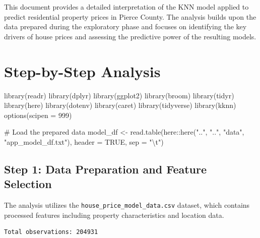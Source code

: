 \documentclass[
  english,
  letterpaper,
  DIV=11,
  numbers=noendperiod]{scrreprt}
\newenvironment{Shaded}{\begin{snugshade}}{\end{snugshade}}
\newcommand{\AttributeTok}[1]{\textcolor[rgb]{0.40,0.45,0.13}{#1}}
\newcommand{\CommentTok}[1]{\textcolor[rgb]{0.37,0.37,0.37}{#1}}
\newcommand{\ConstantTok}[1]{\textcolor[rgb]{0.56,0.35,0.01}{#1}}
\newcommand{\DecValTok}[1]{\textcolor[rgb]{0.68,0.00,0.00}{#1}}
\newcommand{\FunctionTok}[1]{\textcolor[rgb]{0.28,0.35,0.67}{#1}}
\newcommand{\NormalTok}[1]{\textcolor[rgb]{0.00,0.23,0.31}{#1}}
\newcommand{\OtherTok}[1]{\textcolor[rgb]{0.00,0.23,0.31}{#1}}
\newcommand{\SpecialCharTok}[1]{\textcolor[rgb]{0.37,0.37,0.37}{#1}}
\newcommand{\StringTok}[1]{\textcolor[rgb]{0.13,0.47,0.30}{#1}}
\begin{document}
This document provides a detailed interpretation of the KNN model
applied to predict residential property prices in Pierce County. The
analysis builds upon the data prepared during the exploratory phase and
focuses on identifying the key drivers of house prices and assessing the
predictive power of the resulting models.

\section{Step-by-Step Analysis}\label{step-by-step-analysis-1}

\begin{Shaded}
\begin{Highlighting}[]
\FunctionTok{library}\NormalTok{(readr)}
\FunctionTok{library}\NormalTok{(dplyr)}
\FunctionTok{library}\NormalTok{(ggplot2)}
\FunctionTok{library}\NormalTok{(broom)}
\FunctionTok{library}\NormalTok{(tidyr)}
\FunctionTok{library}\NormalTok{(here)}
\FunctionTok{library}\NormalTok{(dotenv)}
\FunctionTok{library}\NormalTok{(caret)}
\FunctionTok{library}\NormalTok{(tidyverse)}
\FunctionTok{library}\NormalTok{(kknn)}
\FunctionTok{options}\NormalTok{(}\AttributeTok{scipen =} \DecValTok{999}\NormalTok{)}

\CommentTok{\# Load the prepared data}
\NormalTok{model\_df }\OtherTok{\textless{}{-}} \FunctionTok{read.table}\NormalTok{(here}\SpecialCharTok{::}\FunctionTok{here}\NormalTok{(}\StringTok{".."}\NormalTok{, }\StringTok{".."}\NormalTok{, }\StringTok{"data"}\NormalTok{, }\StringTok{"app\_model\_df.txt"}\NormalTok{), }\AttributeTok{header =} \ConstantTok{TRUE}\NormalTok{, }\AttributeTok{sep =} \StringTok{"}\SpecialCharTok{\textbackslash{}t}\StringTok{"}\NormalTok{)}
\end{Highlighting}
\end{Shaded}

\subsection{Step 1: Data Preparation and Feature
Selection}\label{step-1-data-preparation-and-feature-selection-1}

The analysis utilizes the \texttt{house\_price\_model\_data.csv}
dataset, which contains processed features including property
characteristics and location data.

\begin{verbatim}
Total observations: 204931 
\end{verbatim}
\end{document}
